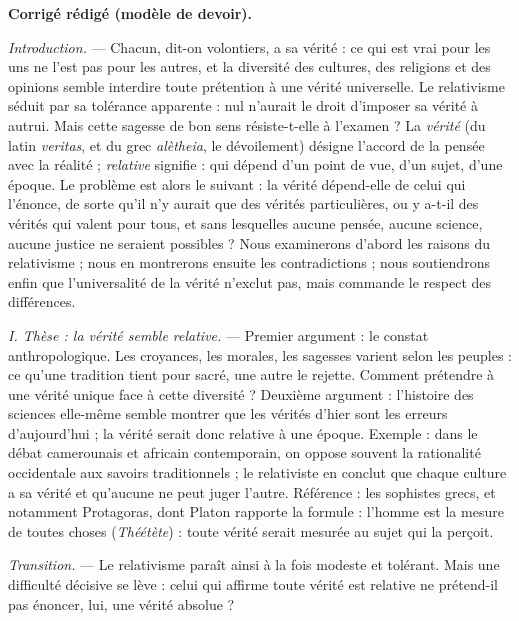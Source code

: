 \documentclass[11pt]{article}
\begin{document}
\begin{corrige}
\textbf{Corrigé rédigé (modèle de devoir).}

\emph{Introduction.} --- Chacun, dit-on volontiers, a sa vérité : ce qui est vrai pour les uns ne l'est pas pour les autres, et la diversité des cultures, des religions et des opinions semble interdire toute prétention à une vérité universelle. Le relativisme séduit par sa tolérance apparente : nul n'aurait le droit d'imposer sa vérité à autrui. Mais cette sagesse de bon sens résiste-t-elle à l'examen ? La \emph{vérité} (du latin \emph{veritas}, et du grec \emph{alètheia}, le dévoilement) désigne l'accord de la pensée avec la réalité ; \emph{relative} signifie : qui dépend d'un point de vue, d'un sujet, d'une époque. Le problème est alors le suivant : la vérité dépend-elle de celui qui l'énonce, de sorte qu'il n'y aurait que des vérités particulières, ou y a-t-il des vérités qui valent pour tous, et sans lesquelles aucune pensée, aucune science, aucune justice ne seraient possibles ? Nous examinerons d'abord les raisons du relativisme ; nous en montrerons ensuite les contradictions ; nous soutiendrons enfin que l'universalité de la vérité n'exclut pas, mais commande le respect des différences.

\emph{I. Thèse : la vérité semble relative.} --- Premier argument : le constat anthropologique. Les croyances, les morales, les sagesses varient selon les peuples : ce qu'une tradition tient pour sacré, une autre le rejette. Comment prétendre à une vérité unique face à cette diversité ? Deuxième argument : l'histoire des sciences elle-même semble montrer que les \guillemotleft vérités \guillemotright d'hier sont les erreurs d'aujourd'hui ; la vérité serait donc relative à une époque. Exemple : dans le débat camerounais et africain contemporain, on oppose souvent la \guillemotleft rationalité occidentale \guillemotright aux savoirs traditionnels ; le relativiste en conclut que chaque culture a sa vérité et qu'aucune ne peut juger l'autre. Référence : les sophistes grecs, et notamment Protagoras, dont Platon rapporte la formule : \guillemotleft l'homme est la mesure de toutes choses \guillemotright (\emph{Théétète}) : toute vérité serait mesurée au sujet qui la perçoit.

\emph{Transition.} --- Le relativisme paraît ainsi à la fois modeste et tolérant. Mais une difficulté décisive se lève : celui qui affirme \guillemotleft toute vérité est relative \guillemotright ne prétend-il pas énoncer, lui, une vérité absolue ?


\end{corrige}
\end{document}
